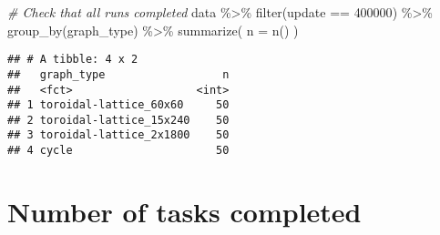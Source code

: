 \documentclass[
]{book}
\newenvironment{Shaded}{\begin{snugshade}}{\end{snugshade}}
\newcommand{\AttributeTok}[1]{\textcolor[rgb]{0.77,0.63,0.00}{#1}}
\newcommand{\CommentTok}[1]{\textcolor[rgb]{0.56,0.35,0.01}{\textit{#1}}}
\newcommand{\DecValTok}[1]{\textcolor[rgb]{0.00,0.00,0.81}{#1}}
\newcommand{\FunctionTok}[1]{\textcolor[rgb]{0.00,0.00,0.00}{#1}}
\newcommand{\NormalTok}[1]{#1}
\newcommand{\SpecialCharTok}[1]{\textcolor[rgb]{0.00,0.00,0.00}{#1}}
\begin{document}
\begin{Shaded}
\begin{Highlighting}[]
\CommentTok{\# Check that all runs completed}
\NormalTok{data }\SpecialCharTok{\%\textgreater{}\%}
  \FunctionTok{filter}\NormalTok{(update }\SpecialCharTok{==} \DecValTok{400000}\NormalTok{) }\SpecialCharTok{\%\textgreater{}\%}
  \FunctionTok{group\_by}\NormalTok{(graph\_type) }\SpecialCharTok{\%\textgreater{}\%}
  \FunctionTok{summarize}\NormalTok{(}
    \AttributeTok{n =} \FunctionTok{n}\NormalTok{()}
\NormalTok{  )}
\end{Highlighting}
\end{Shaded}

\begin{verbatim}
## # A tibble: 4 x 2
##   graph_type                  n
##   <fct>                   <int>
## 1 toroidal-lattice_60x60     50
## 2 toroidal-lattice_15x240    50
## 3 toroidal-lattice_2x1800    50
## 4 cycle                      50
\end{verbatim}

\hypertarget{number-of-tasks-completed-1}{%
\section{Number of tasks completed}\label{number-of-tasks-completed-1}}
\end{document}
